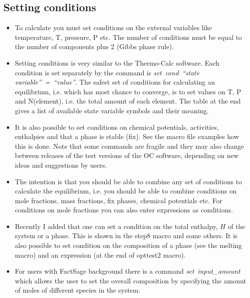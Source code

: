 \documentclass[12pt]{article}
\begin{document}
\subsection{Setting conditions}

\begin{itemize}
\item To calculate you must set conditions on the external variables
  like temperature, T, pressure, P etc.  The number of conditions must
  be equal to the number of components plus 2 (Gibbs phase rule).

\item Setting conditions is very similar to the Thermo-Calc software.
  Each condition is set separately by the command is {\em
    set~cond~``state variable''~=~``value''}.  The safest set of
  conditions for calculating an equilibrium, i.e. which has most
  chance to converge, is to set values on T, P and N(element),
  i.e. the total amount of each element.  The table at the end gives a
  list of available state variable symbols and their meaning.

\item It is also possible to set conditions on chemical potentials,
  activities, enthalpies and that a phase is stable (fix).  See the
  macro file examples how this is done.  Note that some commands are
  fragile and they may also change between releases of the test
  versions of the OC software, depending on new ideas and suggestions
  by users.

\item The intention is that you should be able to combine any set of
  conditions to calculate the equilibrium, i.e. you should be able to
  combine conditions on mole fractions, mass fractions, fix phases,
  chemical potentials etc.  For conditions on mole fractions
  you can also enter expressions as conditions.

\item Recently I added that one can set a condition on the total
  enthalpy, $H$ of the system or a phase.  This is shown in the step8
  macro and some others.  It is also possible to set condition on the
  composition of a phase (see the melting macro) and an expression (at
  the end of opttest2 macro).

\item For users with FactSage background there is a command {\em
  set~input\_amount} which allows the user to set the overall
  composition by specifying the amount of moles of different species
  in the system.

\end{itemize}
\end{document}
